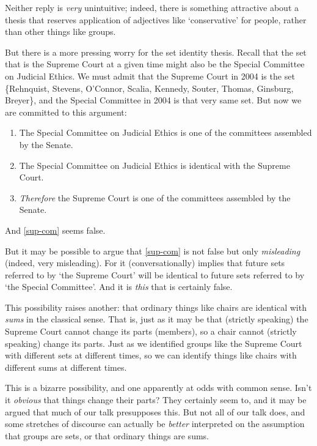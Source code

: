 \documentclass[11pt]{article}
\begin{document}
\begin{spacing}{1.5}
Neither reply is {\em very} unintuitive; indeed, there is something
attractive about a thesis that reserves application of adjectives like
`conservative' for people, rather than other things like groups.

But there is a more pressing worry for the set identity thesis.
Recall that the set that is the Supreme Court at a given time might
also be the Special Committee on Judicial Ethics.  We must admit that
the Supreme Court in 2004 is the set \{Rehnquist, Stevens, O'Connor,
Scalia, Kennedy, Souter, Thomas, Ginsburg, Breyer\}, and the Special
Committee in 2004 is that very same set.  But now we are committed to
this argument:

\begin{enumerate}[ref=(\arabic*)]
  \item The Special Committee on Judicial Ethics is one of the
    committees assembled by the Senate.

  \item The Special Committee on Judicial Ethics is identical with the
    Supreme Court.

  \item {\em Therefore} the Supreme Court is one of the committees
    assembled by the
    Senate. \citep[144]{uzquiano2004a} \label{sup-com}
\end{enumerate}

And \ref{sup-com} seems false.

But it may be possible to argue that \ref{sup-com} is not false but
only {\em misleading} (indeed, very misleading).  For it
(conversationally) implies that future sets referred to by `the
Supreme Court' will be identical to future sets referred to by `the
Special Committee'.  And it is {\em this} that is certainly false.

This possibility raises another: that ordinary things like chairs are
identical with {\em sums} in the classical sense.  That is, just as it
may be that (strictly speaking) the Supreme Court cannot change its
parts (members), so a chair cannot (strictly speaking) change its
parts.  Just as we identified groups like the Supreme Court with
different sets at different times, so we can identify things like
chairs with different sums at different times.

This is a bizarre possibility, and one apparently at odds with common
sense.  Isn't it {\em obvious} that things change their parts?  They
certainly seem to, and it may be argued that much of our talk
presupposes this.  But not all of our talk does, and some stretches of
discourse can actually be {\em better} interpreted on the assumption
that groups are sets, or that ordinary things are sums.


\end{spacing}
\end{document}
